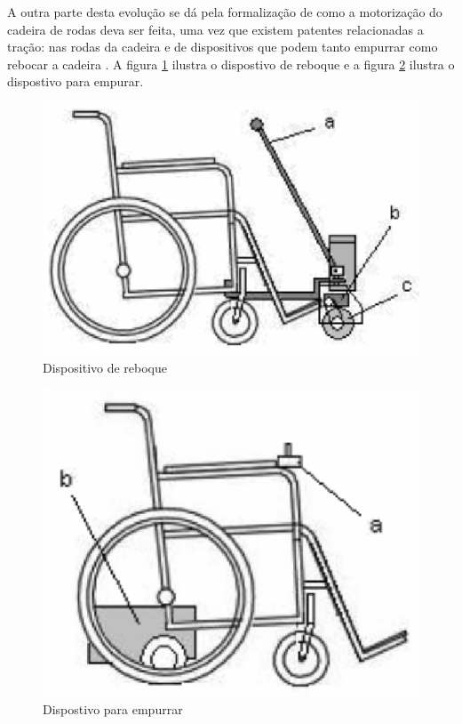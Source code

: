 A outra parte desta evolução se dá pela formalização de como a motorização do cadeira de rodas deva ser feita, uma vez que existem patentes relacionadas a tração: nas rodas da cadeira e de dispositivos que podem tanto empurrar como rebocar a cadeira \cite{artigo_rudi}. A figura \ref{fig:reboque} ilustra o dispostivo de reboque e a figura \ref{fig:anexo_empurrando} ilustra o dispostivo para empurar.

\begin{figure}[!htb]
\centering
  \includegraphics[keepaspectratio=true,scale=0.6]{figuras/introducao/reboque}
\caption{Dispositivo de reboque}
\label{fig:reboque}
\end{figure}

\begin{figure}[!htb]
\centering
  \includegraphics[keepaspectratio=true,scale=0.6]{figuras/introducao/anexo_empurrando}
\caption{Dispostivo para empurrar}
\label{fig:anexo_empurrando}
\end{figure}

